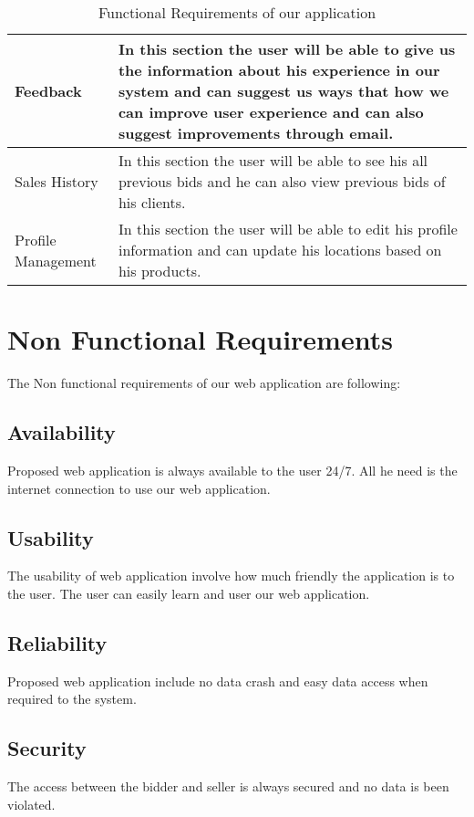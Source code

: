 \begin{table}[!h]
\begin{tabular}{|p{3cm}|p{11cm}|}
        \hline
        Feedback & In this section the user will be able to give us the information about his experience in our system and can suggest us ways that how we can improve user experience and can also suggest improvements through email.\\
        \hline
        Sales History & In this section the user will be able to see his all previous bids and he can also view previous bids of his clients.\\
        \hline
        Profile Management & In this section the user will be able to edit his profile information and can update his locations based on his products.\\
         \hline
    \end{tabular}
    \caption{Functional Requirements of our application}
    \label{tab:NonFER}
\end{table}
\newpage
\section{Non Functional Requirements}
The Non functional requirements of our web application are following:
\subsection{Availability}
Proposed web application is always available to the user 24/7. All he need is the internet connection to use our web application.
\subsection{Usability}
The usability of web application involve how much friendly the application is to the user. The user can easily learn and user our web application.
\subsection{Reliability}
Proposed web application include no data crash and easy data access when required to the system.
\subsection{Security}
The access between the bidder and seller is always secured and no data is been violated. 
\\

\newpage
